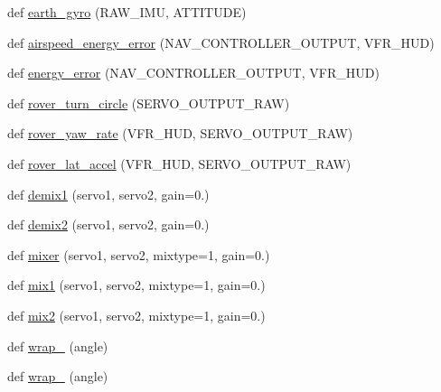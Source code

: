 \begin{DoxyCompactItemize}
\item 
def \mbox{\hyperlink{namespacepymavlink_1_1mavextra_ad31722417bd0b051505d2a9f7e70183a}{earth\+\_\+gyro}} (R\+A\+W\+\_\+\+I\+MU, A\+T\+T\+I\+T\+U\+DE)
\item 
def \mbox{\hyperlink{namespacepymavlink_1_1mavextra_ac195697770b7a0067e109293778a73e1}{airspeed\+\_\+energy\+\_\+error}} (N\+A\+V\+\_\+\+C\+O\+N\+T\+R\+O\+L\+L\+E\+R\+\_\+\+O\+U\+T\+P\+UT, V\+F\+R\+\_\+\+H\+UD)
\item 
def \mbox{\hyperlink{namespacepymavlink_1_1mavextra_a5b8fa5473a3b0961f0a53ab1edd02dc1}{energy\+\_\+error}} (N\+A\+V\+\_\+\+C\+O\+N\+T\+R\+O\+L\+L\+E\+R\+\_\+\+O\+U\+T\+P\+UT, V\+F\+R\+\_\+\+H\+UD)
\item 
def \mbox{\hyperlink{namespacepymavlink_1_1mavextra_a2cf4432c48b582f8471874e3ae33de17}{rover\+\_\+turn\+\_\+circle}} (S\+E\+R\+V\+O\+\_\+\+O\+U\+T\+P\+U\+T\+\_\+\+R\+AW)
\item 
def \mbox{\hyperlink{namespacepymavlink_1_1mavextra_a06610d38e6694c31c2fdbaafd57eae54}{rover\+\_\+yaw\+\_\+rate}} (V\+F\+R\+\_\+\+H\+UD, S\+E\+R\+V\+O\+\_\+\+O\+U\+T\+P\+U\+T\+\_\+\+R\+AW)
\item 
def \mbox{\hyperlink{namespacepymavlink_1_1mavextra_a55bf23fb8b11c2e546dddb4eab80eae0}{rover\+\_\+lat\+\_\+accel}} (V\+F\+R\+\_\+\+H\+UD, S\+E\+R\+V\+O\+\_\+\+O\+U\+T\+P\+U\+T\+\_\+\+R\+AW)
\item 
def \mbox{\hyperlink{namespacepymavlink_1_1mavextra_adf962a14bd3df2e4c752b3ac3c016674}{demix1}} (servo1, servo2, gain=0.)
\item 
def \mbox{\hyperlink{namespacepymavlink_1_1mavextra_acb35268957b8dd904a70309763ab2c95}{demix2}} (servo1, servo2, gain=0.)
\item 
def \mbox{\hyperlink{namespacepymavlink_1_1mavextra_ae33f40df072016fd86d881d715a57f91}{mixer}} (servo1, servo2, mixtype=1, gain=0.)
\item 
def \mbox{\hyperlink{namespacepymavlink_1_1mavextra_ae2ac3b544989ec220c6ef351e7ef5204}{mix1}} (servo1, servo2, mixtype=1, gain=0.)
\item 
def \mbox{\hyperlink{namespacepymavlink_1_1mavextra_a9917a9cc993bdb7a607478dbb089111d}{mix2}} (servo1, servo2, mixtype=1, gain=0.)
\item 
def \mbox{\hyperlink{namespacepymavlink_1_1mavextra_a85414a40febdc276343f85e8ee63d3b4}{wrap\+\_}} (angle)
\item 
def \mbox{\hyperlink{namespacepymavlink_1_1mavextra_ace15c40f51a7caffd4a6364bb0afea52}{wrap\+\_}} (angle)
\item 

\end{DoxyCompactItemize}
